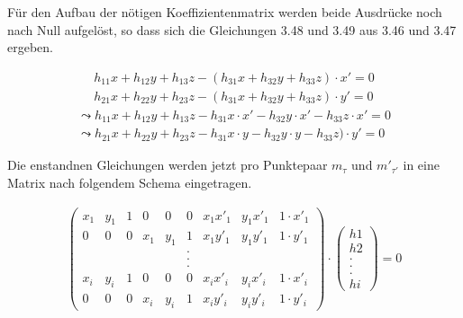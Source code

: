 Für den Aufbau der nötigen Koeffizientenmatrix werden beide Ausdrücke noch nach Null aufgelöst, so dass sich die Gleichungen 3.48 und 3.49 aus 3.46 und 3.47 ergeben.

\begin{gather}
	h_{11}x+h_{12}y+h_{13}z -(h_{31}x+h_{32}y+h_{33}z) \cdot x'= 0 \\	h_{21}x+h_{22}y+h_{23}z-(h_{31}x+h_{32}y+h_{33}z) \cdot y'=0
\end{gather}
\begin{gather}
	\leadsto h_{11}x+h_{12}y+h_{13}z -h_{31}x\cdot x' - h_{32}y \cdot x'-h_{33}z\cdot x'= 0\\
	\leadsto h_{21}x+h_{22}y+h_{23}z-h_{31}x\cdot y -h_{32}y \cdot y -h_{33}z) \cdot y'=0
\end{gather}

Die enstandnen Gleichungen werden jetzt pro Punktepaar $m_\tau$ und $m'_{\tau'}$ in eine Matrix nach folgendem Schema eingetragen.\cite{Elements,HZ,Schwarz,Heipke}

\begin{gather}
	\begin{pmatrix}
		x_1&y_1&1&0&0&0&x_1 x'_1&y_1 x'_1 & 1\cdot x'_1\\
		0&0&0&x_1&y_1&1&x_1 y'_1&y_1 y'_1 & 1\cdot y'_1\\
		&&&&&.&&&\\	
		&&&&&.&&&\\	
		&&&&&.&&&\\	
		x_i&y_i&1&0&0&0&x_i x'_i&y_i x'_i & 1\cdot x'_i\\
		0&0&0&x_i&y_i&1&x_i y'_i&y_i y'_i & 1\cdot y'_i
	\end{pmatrix}
	\cdot
	\begin{pmatrix}
		h1\\h2\\.\\.\\.\\hi
	\end{pmatrix}
	=0
\end{gather}

